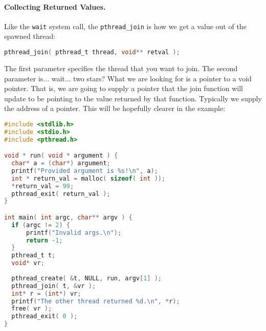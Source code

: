 \paragraph{Collecting Returned Values.} Like the \texttt{wait} system call, the \texttt{pthread\_join} is how we get a value out of the spawned thread:

\begin{lstlisting}[language=C]
pthread_join( pthread_t thread, void** retval );
\end{lstlisting}

The first parameter specifies the thread that you want to join. The second parameter is... wait... two stars? What we are looking for is a pointer to a void pointer. That is, we are going to supply a pointer that the join function will update to be pointing to the value returned by that function. Typically we supply the address of a pointer. This will be hopefully clearer in the example:

\begin{lstlisting}[language=C]
#include <stdlib.h>
#include <stdio.h>
#include <pthread.h>

void * run( void * argument ) { 
  char* a = (char*) argument;
  printf("Provided argument is %s!\n", a); 
  int * return_val = malloc( sizeof( int )); 
  *return_val = 99; 
  pthread_exit( return_val );
}

int main( int argc, char** argv ) { 
  if (argc != 2) {
      printf("Invalid args.\n");
      return -1; 
  }
  pthread_t t;
  void* vr; 
  
  pthread_create( &t, NULL, run, argv[1] );
  pthread_join( t, &vr );
  int* r = (int*) vr; 
  printf("The other thread returned %d.\n", *r);
  free( vr );
  pthread_exit( 0 );
}
\end{lstlisting}



